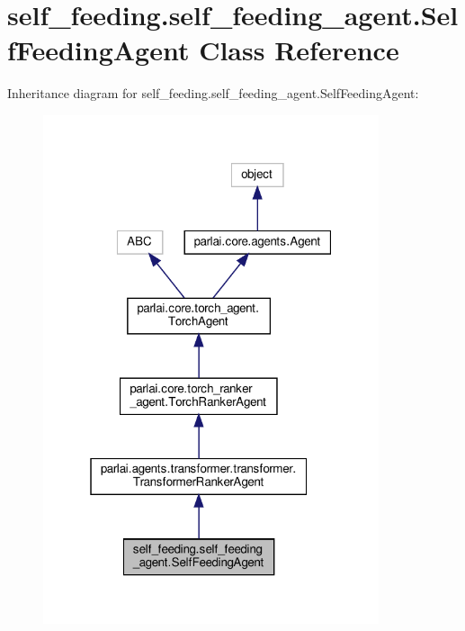 \hypertarget{classself__feeding_1_1self__feeding__agent_1_1SelfFeedingAgent}{}\section{self\+\_\+feeding.\+self\+\_\+feeding\+\_\+agent.\+Self\+Feeding\+Agent Class Reference}
\label{classself__feeding_1_1self__feeding__agent_1_1SelfFeedingAgent}


Inheritance diagram for self\+\_\+feeding.\+self\+\_\+feeding\+\_\+agent.\+Self\+Feeding\+Agent\+:
\nopagebreak
\begin{figure}[H]
\begin{center}
\leavevmode
\includegraphics[width=280pt]{classself__feeding_1_1self__feeding__agent_1_1SelfFeedingAgent__inherit__graph}
\end{center}
\end{figure}


